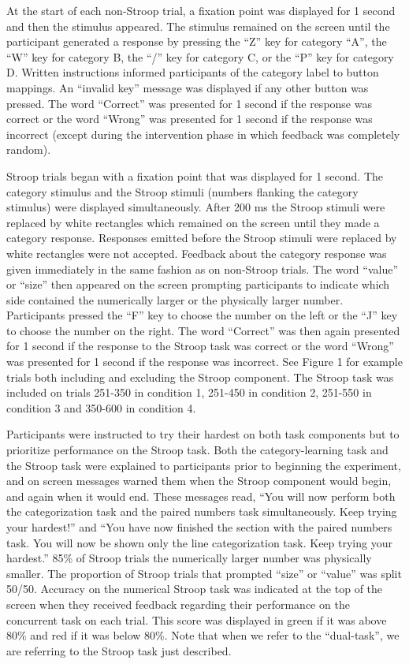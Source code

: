 \documentclass[man,apacite,draftfirst]{apa6}
\begin{document}
At the start of each non-Stroop trial, a fixation point was displayed for 1
second and then the stimulus appeared. The stimulus remained on the screen until
the participant generated a response by pressing the ``Z'' key for category
``A'', the ``W'' key for category B, the ``/'' key for category C, or the ``P''
key for category D. Written instructions informed participants of the category
label to button mappings. An ``invalid key'' message was displayed if any other
button was pressed. The word ``Correct'' was presented for 1 second if the
response was correct or the word ``Wrong'' was presented for 1 second if the
response was incorrect (except during the intervention phase in which feedback
was completely random).

Stroop trials began with a fixation point that was displayed for 1 second. The
category stimulus and the Stroop stimuli (numbers flanking the category
stimulus) were displayed simultaneously. After 200 ms the Stroop stimuli were
replaced by white rectangles which remained on the screen until they made a
category response. Responses emitted before the Stroop stimuli were replaced by
white rectangles were not accepted. Feedback about the category response was
given immediately in the same fashion as on non-Stroop trials. The word
``value'' or ``size'' then appeared on the screen prompting participants to
indicate which side contained the numerically larger or the physically larger
number. Participants pressed the ``F'' key to choose the number on the left or
the ``J'' key to choose the number on the right. The word ``Correct'' was then
again presented for 1 second if the response to the Stroop task was correct or
the word ``Wrong'' was presented for 1 second if the response was incorrect. See
Figure 1 for example trials both including and excluding the Stroop component.
The Stroop task was included on trials 251-350 in condition 1, 251-450 in
condition 2, 251-550 in condition 3 and 350-600 in condition 4.

Participants were instructed to try their hardest on both task components but to
prioritize performance on the Stroop task. Both the category-learning task and
the Stroop task were explained to participants prior to beginning the
experiment, and on screen messages warned them when the Stroop component would
begin, and again when it would end. These messages read, ``You will now perform
both the categorization task and the paired numbers task simultaneously. Keep
trying your hardest!'' and ``You have now finished the section with the paired
numbers task. You will now be shown only the line categorization task. Keep
trying your hardest.'' 85\% of Stroop trials the numerically larger number was
physically smaller. The proportion of Stroop trials that prompted ``size'' or
``value'' was split 50/50. Accuracy on the numerical Stroop task was indicated
at the top of the screen when they received feedback regarding their performance
on the concurrent task on each trial. This score was displayed in green if it
was above 80\% and red if it was below 80\%. Note that when we refer to the
``dual-task'', we are referring to the Stroop task just described.
\end{document}
